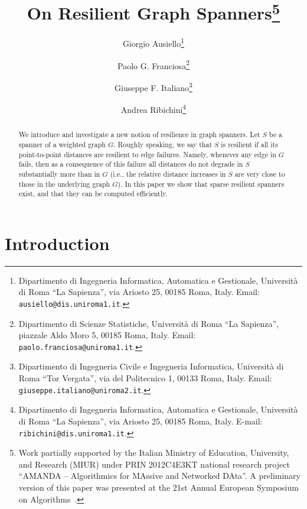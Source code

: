 \documentclass{article}
\begin{document}
\pagestyle{plain}

\title{\bf On Resilient Graph Spanners\thanks{Work partially supported by the Italian Ministry of Education,
University, and Research (MIUR) under PRIN 2012C4E3KT national
research project ``AMANDA -- Algorithmics for MAssive and Networked
DAta''. A preliminary version of this paper was presented at the 21st Annual European Symposium on Algorithms~\cite{AFIR13}.}}

\author{Giorgio Ausiello\footnote{Dipartimento di Ingegneria Informatica, Automatica e Gestionale, Universit\`a
di Roma ``La Sapienza'', via Ariosto 25, 00185 Roma, Italy. Email: {\tt ausiello@dis.uniroma1.it}.}
\and 
Paolo G. Franciosa\footnote{Dipartimento di Scienze Statistiche, Universit\`a di Roma ``La Sapienza'',
piazzale Aldo Moro 5, 00185 Roma, Italy. Email: {\tt paolo.franciosa@uniroma1.it}.} 
\and 
Giuseppe F. Italiano\footnote{Dipartimento di Ingegneria Civile e Ingegneria Informatica,
Universit\`a di Roma ``Tor Vergata'', via del Politecnico 1, 00133
Roma, Italy. Email: {\tt giuseppe.italiano@uniroma2.it}.} 
\and 
Andrea Ribichini\footnote{Dipartimento di Ingegneria Informatica, Automatica e Gestionale, Universit\`a
di Roma ``La Sapienza'', via Ariosto 25, 00185 Roma, Italy. E-mail: {\tt ribichini@dis.uniroma1.it}.}
}

\date{}

\maketitle

\begin{abstract}
We introduce and investigate a new notion of resilience in graph spanners. 
Let $S$ be a spanner of a weighted graph $G$.
Roughly speaking, 
we say that $S$ is resilient if all its point-to-point distances are resilient to edge failures. Namely, whenever any edge in $G$ fails, then as a consequence of this failure all  distances do not degrade in $S$ substantially more than in $G$ (i.e., the relative distance
increases in $S$ are very close to those in the underlying graph $G$).
In this paper 
we show that sparse resilient spanners exist, and that they can be computed efficiently.
\end{abstract}

\section{Introduction}
\end{document}
